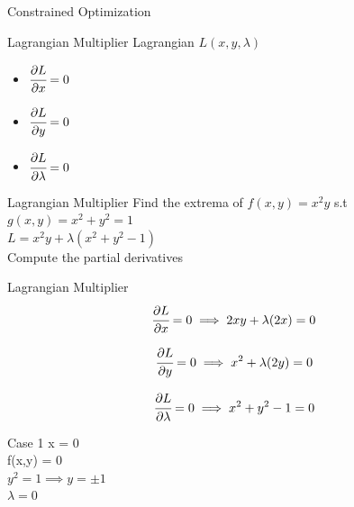 \documentclass{beamer}
\begin{document}
\begin{frame}{Constrained Optimization}

\end{frame}

\begin{frame}{Lagrangian Multiplier}
    Lagrangian $L(x,y,\lambda)$
    \begin{itemize}
        \item $\cfrac{\partial L}{\partial x} = 0$
        \item $\cfrac{\partial L}{\partial y} = 0$
        \item $\cfrac{\partial L}{\partial \lambda} = 0$
    \end{itemize}
    
\end{frame}


\begin{frame}{Lagrangian Multiplier}
    Find the extrema of $f(x,y) =x^{2}y$ s.t $g(x,y)=x^{2}+y^{2} = 1$ \\
    \vspace{1em}
    $L = x^{2}y + \lambda (x^{2} + y^{2} - 1)$\\
    \vspace{1em}
    Compute the partial derivatives
\end{frame}

\begin{frame}{Lagrangian Multiplier}
    \begin{equation}
        \cfrac{\partial L}{\partial x} = 0 \implies 2xy + \lambda(2x) = 0
    \end{equation}
    
    \begin{equation}
        \cfrac{\partial L}{\partial y} = 0 \implies x^{2} + \lambda(2y) = 0
    \end{equation}
    
    \begin{equation}
        \cfrac{\partial L}{\partial \lambda} = 0 \implies x^{2} + y^{2} - 1 = 0
    \end{equation}
\end{frame}

\begin{frame}{Case 1}
    x = 0\\
    \vspace{1em}
    f(x,y) = 0\\
    \vspace{1em}
    $y^{2} = 1 \implies y= \pm 1$\\
    \vspace{1em}
    $\lambda = 0$
\end{frame}
\end{document}
